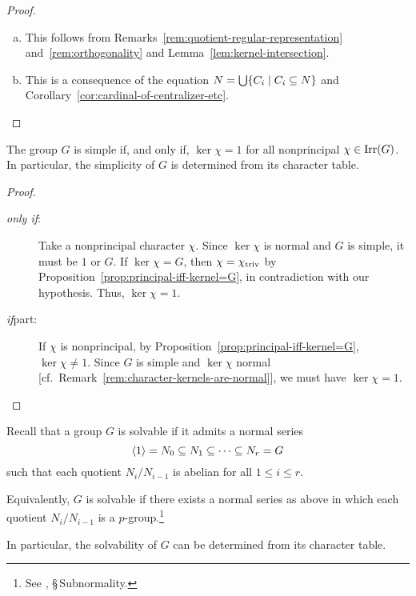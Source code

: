 \begin{proof}${}$
    \begin{enumerate}[a),font=\upshape]
        \item This follows from Remarks~\ref{rem:quotient-regular-representation} and~\ref{rem:orthogonality} and Lemma~\ref{lem:kernel-intersection}.
        
        \item This is a consequence of the equation $N=\bigcup\{C_i\mid C_i\subseteq N\}$ and Corollary~\ref{cor:cardinal-of-centralizer-etc}.
    \end{enumerate}
\end{proof}

\begin{thm}
     The group\/ $G$ is simple if, and only if, $\ker\chi=1$ for all nonprincipal\/ $\chi\in\operatorname{Irr}(G)$. In particular, the simplicity of\/ $G$ is determined from its character table.
\end{thm}

\begin{proof}${}$
    \begin{description}
        \item[\rm\textit{only if\/}:] Take a nonprincipal character $\chi$. Since $\ker\chi$ is normal and $G$ is simple, it must be $1$ or $G$. If $\ker\chi=G$, then $\chi={\chi}_{\mathrm{triv}}$ by Proposition~\ref{prop:principal-iff-kernel=G}, in contradiction with our hypothesis. Thus, $\ker\chi=1$.

        \item[\rm\textit{if\/}part:] If $\chi$ is nonprincipal, by Proposition~\ref{prop:principal-iff-kernel=G}, $\ker\chi\ne1$. Since $G$ is simple and $\ker\chi$ normal [cf.~Remark~\ref{rem:character-kernels-are-normal}], we must have $\ker\chi=1$.
    \end{description}
\end{proof}

\begin{rem}
    Recall that a group $G$ is solvable if it admits a normal series  
    $$
        \langle1\rangle = N_0 \subseteq N_1 \subseteq \cdots \subseteq N_r = G
    $$
    such that each quotient $N_i/N_{i-1}$ is abelian for all $1 \le i \le r$.
    
    Equivalently, $G$ is solvable if there exists a normal series as above in which each quotient $N_i/N_{i-1}$ is a $p$-group.\footnote{See \citep{LC-groups}, \S\,Subnormality.}
    
    In particular, the solvability of $G$ can be determined from its character table.
\end{rem}


